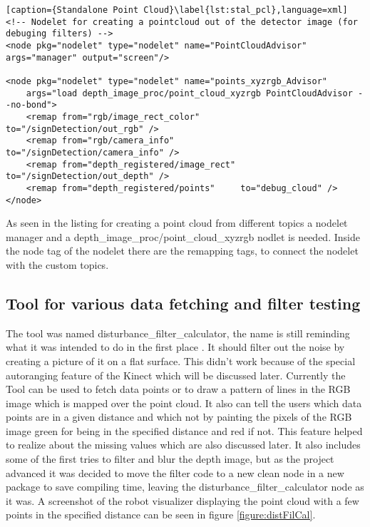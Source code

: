 \begin{lstlisting}[caption={Standalone Point Cloud}\label{lst:stal_pcl},language=xml]
<!-- Nodelet for creating a pointcloud out of the detector image (for debuging filters) -->
<node pkg="nodelet" type="nodelet" name="PointCloudAdvisor" args="manager" output="screen"/>

<node pkg="nodelet" type="nodelet" name="points_xyzrgb_Advisor" 
	args="load depth_image_proc/point_cloud_xyzrgb PointCloudAdvisor --no-bond">
    <remap from="rgb/image_rect_color"        to="/signDetection/out_rgb" />
    <remap from="rgb/camera_info"             to="/signDetection/camera_info" />
    <remap from="depth_registered/image_rect" to="/signDetection/out_depth" />
    <remap from="depth_registered/points"     to="debug_cloud" />
</node>
\end{lstlisting}



As seen in the listing for creating a point cloud from different topics a nodelet manager and a 
depth\_image\_proc/point\_cloud\_xyzrgb nodlet is needed. Inside the node tag of the nodelet
there are the remapping tags, to connect the nodelet with the custom topics.

\subsection{Tool for various data fetching and filter testing}
The tool was named disturbance\_filter\_calculator, the name is still reminding what it was intended to do in the first place
. It should filter out the noise by creating a picture of it on a flat surface. This didn't work because of the special 
autoranging feature of the Kinect which will be discussed later. Currently the Tool can be used to fetch data points or to
draw a pattern of lines in the RGB image which is mapped over the point cloud. It also can tell the users which data points
are in a given distance and which not by painting the pixels of the RGB image green for being in the specified distance
and red if not. This feature helped to realize about the missing values which are also discussed later. It also includes
some of the first tries to filter and blur the depth image, but as the project advanced it was decided to move the 
filter code to a new clean node in a new package to save compiling time, leaving the disturbance\_filter\_calculator 
node as it was. A screenshot of the robot visualizer displaying the point cloud with a few points in the specified distance
can be seen in figure \vref{figure:distFilCal}.

